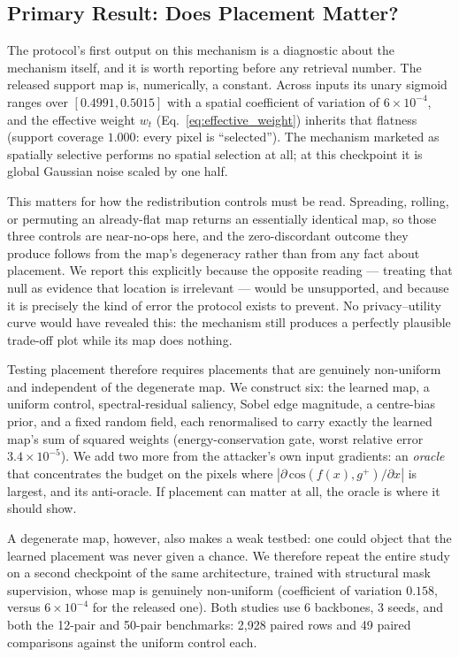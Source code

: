 \documentclass[10pt,journal]{IEEEtran}
\begin{document}
\subsection{Primary Result: Does Placement Matter?}
\label{sec:causality}

The protocol's first output on this mechanism is a diagnostic about the
mechanism itself, and it is worth reporting before any retrieval number. The
released support map is, numerically, a constant. Across inputs its unary
sigmoid ranges over $[0.4991, 0.5015]$ with a spatial coefficient of variation
of $6\times10^{-4}$, and the effective weight $w_t$
(Eq.~\eqref{eq:effective_weight}) inherits that flatness (support coverage
$1.000$: every pixel is ``selected''). The mechanism marketed as spatially
selective performs no spatial selection at all; at this checkpoint it is
global Gaussian noise scaled by one half.

This matters for how the redistribution controls must be read. Spreading,
rolling, or permuting an already-flat map returns an essentially identical
map, so those three controls are near-no-ops here, and the zero-discordant
outcome they produce follows from the map's degeneracy rather than from any
fact about placement. We report this explicitly because the opposite reading
--- treating that null as evidence that location is irrelevant --- would be
unsupported, and because it is precisely the kind of error the protocol
exists to prevent. No privacy--utility curve would have revealed this: the
mechanism still produces a perfectly plausible trade-off plot while its map
does nothing.

Testing placement therefore requires placements that are genuinely
non-uniform and independent of the degenerate map. We construct six: the
learned map, a uniform control, spectral-residual saliency, Sobel edge
magnitude, a centre-bias prior, and a fixed random field, each renormalised
to carry exactly the learned map's sum of squared weights (energy-conservation
gate, worst relative error $3.4\times10^{-5}$). We add two more from the
attacker's own input gradients: an \emph{oracle} that concentrates the budget
on the pixels where $|\partial\,\mathrm{cos}(f(x),g^{+})/\partial x|$ is
largest, and its anti-oracle. If placement can matter at all, the oracle is
where it should show.

A degenerate map, however, also makes a weak testbed: one could object that
the learned placement was never given a chance. We therefore repeat the entire
study on a second checkpoint of the same architecture, trained with structural
mask supervision, whose map is genuinely non-uniform (coefficient of variation
$0.158$, versus $6\times10^{-4}$ for the released one). Both studies use 6
backbones, 3 seeds, and both the 12-pair and 50-pair benchmarks: 2,928 paired
rows and 49 paired comparisons against the uniform control each.
\end{document}
